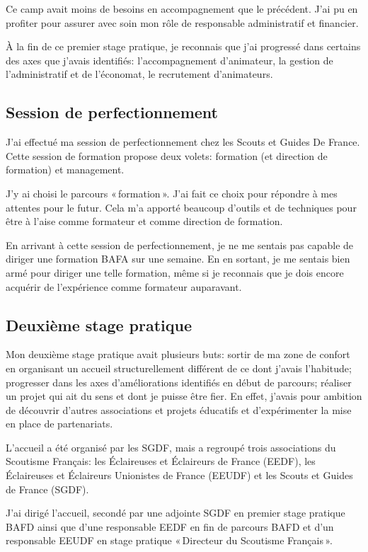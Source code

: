 \documentclass[titlepage,11pt,a4paper]{article}
\begin{document}
Ce camp avait moins de besoins en accompagnement que le précédent. J'ai pu en profiter
pour assurer avec soin mon rôle de responsable administratif et financier.

À la fin de ce premier stage pratique, je reconnais que j'ai progressé dans certains des
axes que j'avais identifiés: l'accompagnement d'animateur, la gestion de l'administratif
et de l'économat, le recrutement d'animateurs.

\subsection{Session de perfectionnement}

J'ai effectué ma session de perfectionnement chez les Scouts et Guides De France.
Cette session de formation propose deux volets: formation (et direction de formation)
et management.

J'y ai choisi le parcours «\,formation\,». J'ai fait ce choix pour répondre à mes attentes
pour le futur. Cela m'a apporté beaucoup d'outils et de techniques pour être à l'aise
comme formateur et comme direction de formation.

En arrivant à cette session de perfectionnement, je ne me sentais pas capable de diriger une
formation BAFA sur une semaine. En en sortant, je me sentais bien armé pour diriger une
telle formation, même si je reconnais que je dois encore acquérir de l'expérience comme
formateur auparavant.

\subsection{Deuxième stage pratique}

Mon deuxième stage pratique avait plusieurs buts: sortir de ma zone de confort en
organisant un accueil structurellement différent de ce dont j'avais l'habitude; progresser
dans les axes d'améliorations identifiés en début de parcours; réaliser un projet qui ait
du sens et dont je puisse être fier. En effet, j'avais pour ambition de découvrir
d'autres associations et projets éducatifs et d'expérimenter la mise en place de partenariats.

L'accueil a été organisé par les SGDF, mais a regroupé trois associations du Scoutisme
Français: les Éclaireuses et Éclaireurs de France (EEDF), les Éclaireuses et Éclaireurs
Unionistes de France (EEUDF) et les Scouts et Guides de France (SGDF).

J'ai dirigé l'accueil, secondé par une adjointe SGDF en premier stage pratique BAFD
ainsi que d'une responsable EEDF en fin de parcours BAFD et d'un responsable
EEUDF en stage pratique «\,Directeur du Scoutisme Français\,».
\end{document}
